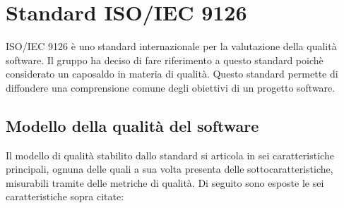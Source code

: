 \section{Standard ISO/IEC 9126} \label{section:ISO_IEC_9126}
ISO/IEC 9126 è uno standard internazionale per la valutazione della qualità software.
Il gruppo \groupName ha deciso di fare riferimento a questo standard poichè considerato un caposaldo in materia di qualità.
Questo standard permette di diffondere una comprensione comune degli obiettivi di un progetto software.

\subsection{Modello della qualità del software} \label{subsection:modello_qualitaSW}
Il modello di qualità stabilito dallo standard si articola in sei caratteristiche principali, ognuna delle quali a sua volta presenta delle sottocaratteristiche, misurabili tramite delle metriche di qualità.
Di seguito sono esposte le sei caratteristiche sopra citate:
